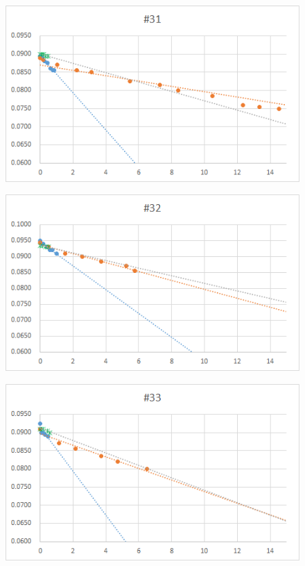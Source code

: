   \begin{figure}[htbp]
    \centering
       \includegraphics[width=120mm]{vol_031.png}
  \end{figure}
  \begin{figure}[htbp]
    \centering
       \includegraphics[width=120mm]{vol_032.png}
  \end{figure}
  \begin{figure}[htbp]
    \centering
       \includegraphics[width=120mm]{vol_033.png}
  \end{figure}
